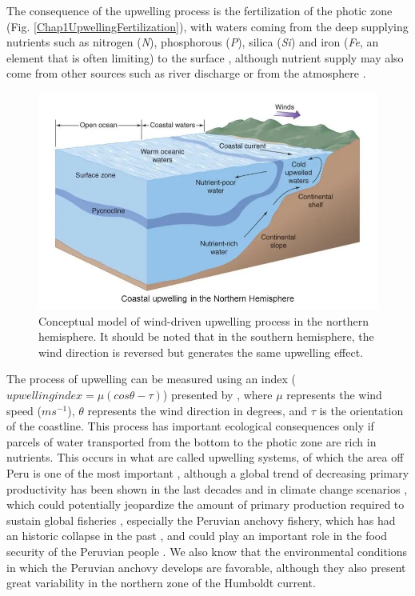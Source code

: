 The consequence of the upwelling process is the fertilization of the photic zone (Fig. \ref{Chap1UpwellingFertilization}), with waters coming from the deep supplying nutrients such as nitrogen (\textit{N}), phosphorous (\textit{P}), silica (\textit{Si}) and iron (\textit{Fe}, an element that is often limiting) to the surface \citep{GeidLaro1994,BehrBale1996,BehrKolb1999,HutcSedw2001,HutcHare2002,MoorMils2013,HutcBoyd2016,BrisMohr2017}, although nutrient supply may also come from other sources such as river discharge \citep{SharMidd2017} or from the atmosphere \citep{PoweBake2015}.\\

\begin{figure}[H]
	\centering
	\includegraphics[width=1.0\textwidth]{figures/Chap1CoastalUpwelling.png}
	\caption{Conceptual model of wind-driven upwelling process in the northern hemisphere. It should be noted that in the southern hemisphere, the wind direction is reversed but generates the same upwelling effect.}
	\label{Chap1CoastalUpwelling}
\end{figure}

The process of upwelling can be measured using an index ($upwelling index = \mu \left ( cos\theta -\tau  \right )$) presented by \cite{FielDavi1989}, where $\mu$ represents the wind speed ($ms^{-1}$), $\theta$ represents the wind direction in degrees, and $\tau$ is the orientation of the coastline. This process has important ecological consequences only if parcels of water transported from the bottom to the photic zone are rich in nutrients. This occurs in what are called upwelling systems, of which the area off Peru is one of the most important \citep{ChavBert2008}, although  a global trend of decreasing primary productivity has been shown in the last decades \citep{Dema2009,RoxyModi2016} and in climate change scenarios \citep{BlancJenn2012,KulkPlat2020}, which could potentially jeopardize the amount of primary production required to sustain global fisheries \citep{PaulChri1995}, especially the Peruvian anchovy fishery, which has had an historic collapse in the past \citep{AriaNiqu2011,Aria2012}, and could play an important role in the food security of the Peruvian people \citep{MajlDela2017}. We also know that the environmental conditions in which the Peruvian anchovy develops are favorable, although they also present great variability in the northern zone of the Humboldt current.\\

